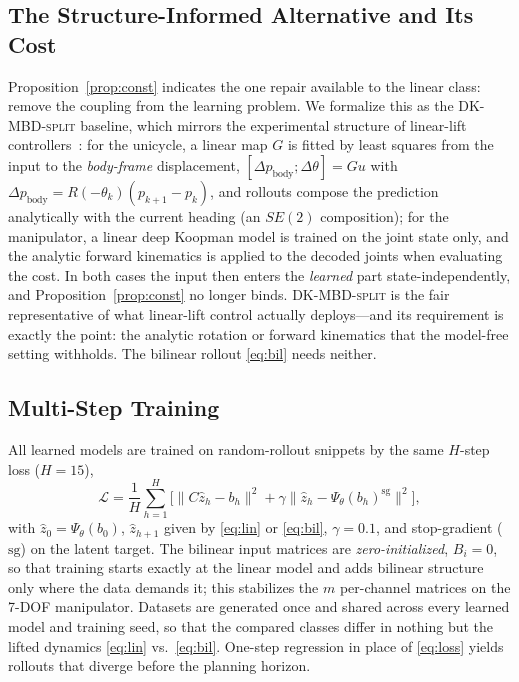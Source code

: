 \documentclass[lettersize,journal]{IEEEtran}
\theoremstyle{remark}
\newcommand{\dksplit}{\textsc{DK-MBD-split}}
\begin{document}
\subsection{The Structure-Informed Alternative and Its Cost}\label{subsec:split}

Proposition~\ref{prop:const} indicates the one repair available to the
linear class: remove the coupling from the learning problem. We formalize
this as the \dksplit{} baseline, which mirrors the experimental structure
of linear-lift controllers~\cite{mppidk2026, korda2018mpc}: for the
unicycle, a linear map $G$ is fitted by least squares from the input to
the \emph{body-frame} displacement,
$[\Delta p_{\mathrm{body}}; \Delta\theta] = G u$ with
$\Delta p_{\mathrm{body}} = R(-\theta_k)(p_{k+1} - p_k)$, and rollouts
compose the prediction analytically with the current heading (an $SE(2)$
composition); for the manipulator, a linear deep Koopman model is trained
on the joint state only, and the analytic forward kinematics is applied to
the decoded joints when evaluating the cost. In both cases the input then
enters the \emph{learned} part state-independently, and
Proposition~\ref{prop:const} no longer binds. \dksplit{} is the fair
representative of what linear-lift control actually deploys---and its
requirement is exactly the point: the analytic rotation or forward
kinematics that the model-free setting withholds. The bilinear rollout
\eqref{eq:bil} needs neither.

\subsection{Multi-Step Training}\label{subsec:training}

All learned models are trained on random-rollout snippets by the same
$H$-step loss ($H = 15$),
\begin{equation}
\mathcal{L} = \frac{1}{H} \sum_{h=1}^{H}
\Big[ \big\| C \hat{z}_h - b_h \big\|^{2}
+ \gamma \big\| \hat{z}_h - \Psi_\theta(b_h)^{\mathrm{sg}} \big\|^{2}
\Big],
\label{eq:loss}
\end{equation}
with $\hat z_0 = \Psi_\theta(b_0)$, $\hat z_{h+1}$ given by
\eqref{eq:lin} or \eqref{eq:bil}, $\gamma = 0.1$, and stop-gradient
($\mathrm{sg}$) on the latent target. The bilinear input matrices are
\emph{zero-initialized}, $B_i = 0$, so that training starts exactly at the
linear model and adds bilinear structure only where the data demands it;
this stabilizes the $m$ per-channel matrices on the 7-DOF manipulator.
Datasets are generated once and shared across every learned model and
training seed, so that the compared classes differ in nothing but the
lifted dynamics \eqref{eq:lin} vs.\ \eqref{eq:bil}. One-step regression in
place of \eqref{eq:loss} yields rollouts that diverge before the planning
horizon.
\end{document}
